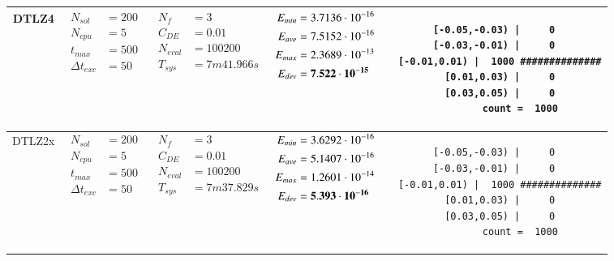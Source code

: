 \begin{table*} [!t]
\begin{tabular}[c]{ccccc}
\hline



DTLZ4
&
{$\!\begin{aligned}
    N_{sol}        &= 200 \\
	N_{cpu}        &= 5 \\
	t_{max}        &= 500 \\
	\Delta t_{exc} &= 50
\end{aligned}$}
&
{$\!\begin{aligned}
	N_{f}    &= 3 \\
	C_{DE}   &= 0.01 \\
	N_{eval} &= 100200 \\
	T_{sys}  &= 7m41.966s
\end{aligned}$}
&
{$\!\begin{aligned}
    E_{min} &= 3.7136\cdot 10^{-16} \\
    E_{ave} &= 7.5152\cdot 10^{-16} \\
    E_{max} &= 2.3689\cdot 10^{-13} \\
    E_{dev} &= {\bf 7.522\cdot 10^{-15}}
\end{aligned}$}
&
\begin{minipage}{4.1cm} \fontsize{5pt}{6pt}
\begin{verbatim}
 [-0.05,-0.03) |     0 
 [-0.03,-0.01) |     0 
  [-0.01,0.01) |  1000 ##############
   [0.01,0.03) |     0 
   [0.03,0.05) |     0 
         count =  1000
 \end{verbatim}
\end{minipage} \\

\hline



DTLZ2x
&
{$\!\begin{aligned}
    N_{sol}        &= 200 \\
	N_{cpu}        &= 5 \\
	t_{max}        &= 500 \\
	\Delta t_{exc} &= 50
\end{aligned}$}
&
{$\!\begin{aligned}
	N_{f}    &= 3 \\
	C_{DE}   &= 0.01 \\
	N_{eval} &= 100200 \\
	T_{sys}  &= 7m37.829s
\end{aligned}$}
&
{$\!\begin{aligned}
    E_{min} &= 3.6292\cdot 10^{-16} \\
    E_{ave} &= 5.1407\cdot 10^{-16} \\
    E_{max} &= 1.2601\cdot 10^{-14} \\
    E_{dev} &= {\bf 5.393\cdot 10^{-16}}
\end{aligned}$}
&
\begin{minipage}{4.1cm} \fontsize{5pt}{6pt}
\begin{verbatim}
 [-0.05,-0.03) |     0 
 [-0.03,-0.01) |     0 
  [-0.01,0.01) |  1000 ##############
   [0.01,0.03) |     0 
   [0.03,0.05) |     0 
         count =  1000
 \end{verbatim}
\end{minipage} \\


\end{tabular}
\end{table*}
